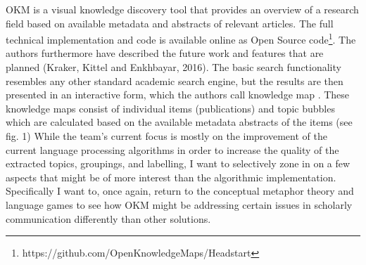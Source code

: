 OKM is a visual knowledge discovery tool that provides an overview of a research field based on available metadata and abstracts of relevant articles. The full technical implementation and code is available online as Open Source code\footnote{https://github.com/OpenKnowledgeMaps/Headstart}. The authors furthermore have described the future work and features that are planned (Kraker, Kittel and Enkhbayar, 2016). The basic search functionality resembles any other standard academic search engine, but the results are then presented in an interactive form, which the authors call knowledge map . These knowledge maps consist of individual items
(publications) and topic bubbles which are calculated based on the available metadata abstracts of the items (see fig. 1) While the team’s current focus is mostly on the improvement of the current language processing algorithms in order to increase the quality of the extracted topics, groupings, and labelling, I want to selectively zone in on a few aspects that might be of more interest than the algorithmic implementation. Specifically I want to, once again, return to the
conceptual metaphor theory and language games to see how OKM might be addressing certain issues in scholarly communication differently than other solutions.